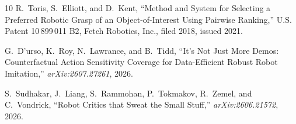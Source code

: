 \documentclass[journal]{IEEEtran}
\begin{document}
\begin{thebibliography}{10}
R.~Toris, S.~Elliott, and D.~Kent,
``Method and System for Selecting a Preferred Robotic Grasp of an
  Object-of-Interest Using Pairwise Ranking,''
U.S. Patent 10\,899\,011 B2, Fetch Robotics, Inc., filed 2018, issued 2021.

G.~D'urso, K.~Roy, N.~Lawrance, and B.~Tidd,
``It's Not Just More Demos: Counterfactual Action Sensitivity Coverage
  for Data-Efficient Robust Robot Imitation,''
\emph{arXiv:2607.27261}, 2026.

S.~Sudhakar, J.~Liang, S.~Rammohan, P.~Tokmakov, R.~Zemel, and C.~Vondrick,
``Robot Critics that Sweat the Small Stuff,''
\emph{arXiv:2606.21572}, 2026.

\end{thebibliography}
\end{document}
